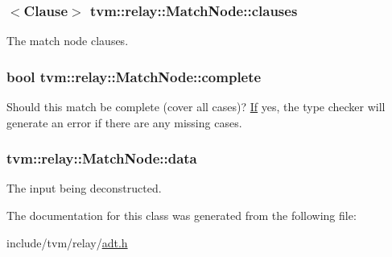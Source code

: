 \subsubsection[{\texorpdfstring{clauses}{clauses}}]{$<${\bf Clause}$>$ tvm\+::relay\+::\+Match\+Node\+::clauses}\hypertarget{classtvm_1_1relay_1_1MatchNode_a1e35f1c0a12e235eb052cd48f6659cd6}{}\label{classtvm_1_1relay_1_1MatchNode_a1e35f1c0a12e235eb052cd48f6659cd6}


The match node clauses. 

\subsubsection[{\texorpdfstring{complete}{complete}}]{\setlength{\rightskip}{0pt plus 5cm}bool tvm\+::relay\+::\+Match\+Node\+::complete}\hypertarget{classtvm_1_1relay_1_1MatchNode_a17c6c8bd3fccfa7f86ace014db7fd694}{}\label{classtvm_1_1relay_1_1MatchNode_a17c6c8bd3fccfa7f86ace014db7fd694}


Should this match be complete (cover all cases)? \hyperlink{classtvm_1_1relay_1_1If}{If} yes, the type checker will generate an error if there are any missing cases. 

\subsubsection[{\texorpdfstring{data}{data}}]{ tvm\+::relay\+::\+Match\+Node\+::data}\hypertarget{classtvm_1_1relay_1_1MatchNode_a2bbd42a0a2bdbdf35662f8866c6a5f97}{}\label{classtvm_1_1relay_1_1MatchNode_a2bbd42a0a2bdbdf35662f8866c6a5f97}


The input being deconstructed. 



The documentation for this class was generated from the following file\+:\begin{DoxyCompactItemize}
\item 
include/tvm/relay/\hyperlink{relay_2adt_8h}{adt.\+h}\end{DoxyCompactItemize}

